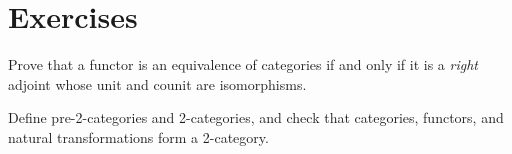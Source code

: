 \section*{Exercises}
\label{sec:ct:exercises}

\begin{ex}
  Prove that a functor is an equivalence of categories if and only if it is a \emph{right} adjoint whose unit and counit are isomorphisms.
\end{ex}

\begin{ex}
  Define pre-2-categories and 2-categories, and check that categories, functors, and natural transformations form a 2-category.
\end{ex}


